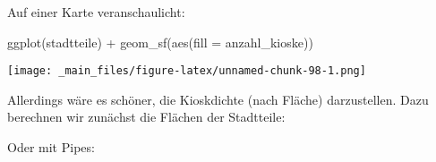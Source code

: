 \documentclass[
  ngerman,
]{article}
\newenvironment{Shaded}{\begin{snugshade}}{\end{snugshade}}
\newcommand{\AttributeTok}[1]{\textcolor[rgb]{0.77,0.63,0.00}{#1}}
\newcommand{\DecValTok}[1]{\textcolor[rgb]{0.00,0.00,0.81}{#1}}
\newcommand{\FunctionTok}[1]{\textcolor[rgb]{0.00,0.00,0.00}{#1}}
\newcommand{\NormalTok}[1]{#1}
\newcommand{\OtherTok}[1]{\textcolor[rgb]{0.56,0.35,0.01}{#1}}
\newcommand{\SpecialCharTok}[1]{\textcolor[rgb]{0.00,0.00,0.00}{#1}}
\begin{document}
Auf einer Karte veranschaulicht:

\begin{Shaded}
\begin{Highlighting}[]
\FunctionTok{ggplot}\NormalTok{(stadtteile) }\SpecialCharTok{+}
  \FunctionTok{geom\_sf}\NormalTok{(}\FunctionTok{aes}\NormalTok{(}\AttributeTok{fill =}\NormalTok{ anzahl\_kioske))}
\end{Highlighting}
\end{Shaded}

\texttt{[image: \_main\_files/figure-latex/unnamed-chunk-98-1.png]}

Allerdings wäre es schöner, die Kioskdichte (nach Fläche) darzustellen. Dazu berechnen wir zunächst die Flächen der Stadtteile:

\begin{Shaded}
\end{Shaded}

Oder mit Pipes:
\end{document}
